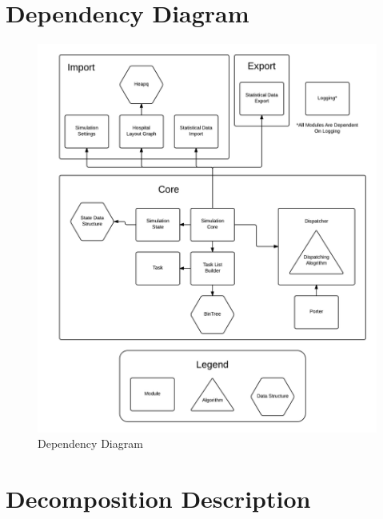 \documentclass[paper=letter, fontsize=10pt]{scrartcl}
\numberwithin{equation}{section}		%
\numberwithin{figure}{section}			%
\numberwithin{table}{section}				%
\begin{document}
\section{Dependency Diagram}
\begin{figure}[H]
	\begin{center}
		\includegraphics[width=1\textwidth, height=0.8\textheight, keepaspectratio]{../Process_Diagrams/Dependency_Diagram.png}
		\caption{Dependency Diagram}
	\end{center}
\end{figure}

\section{Decomposition Description}
\end{document}
